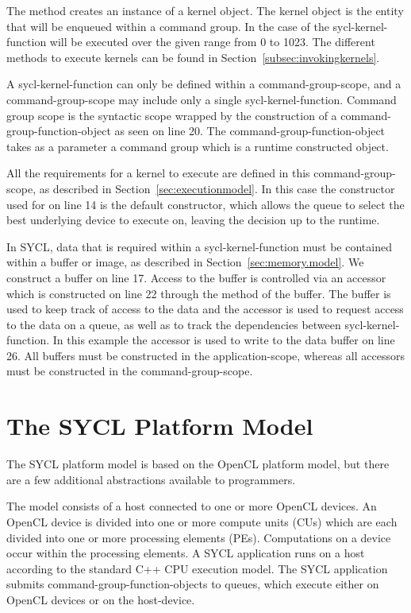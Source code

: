 The  method creates an instance of a kernel object.
The kernel object is the entity that will be enqueued within a
command group.  In the case of  the
\gls{sycl-kernel-function} will be executed over the given range from 0 to 1023.
The different methods to
execute kernels can be found in Section~\ref{subsec:invokingkernels}.

A \gls{sycl-kernel-function} can only be defined within a
\gls{command-group-scope}, and a \gls{command-group-scope} may include
only a single \gls{sycl-kernel-function}. Command group scope is the
syntactic scope wrapped by the construction of a
\gls{command-group-function-object} as seen on line 20. The
\gls{command-group-function-object} takes as a parameter a command
group  which is a runtime constructed object.

All the requirements for a kernel to execute are defined in this
\gls{command-group-scope}, as described in
Section~\ref{sec:executionmodel}.  In this case the constructor used
for  on line 14 is the default constructor, which
allows the queue to select the best underlying device to execute on,
leaving the decision up to the runtime.

In SYCL, data that is required within a \gls{sycl-kernel-function} must
be contained within a \gls{buffer} or \gls{image}, as described in
Section~\ref{sec:memory.model}. We
construct a buffer on line 17. Access to the \gls{buffer} is controlled via
an \gls{accessor} which is constructed on line 22 through the
 method of the buffer. The \gls{buffer} is used to
keep track of access to the data and the \gls{accessor} is used to request
access to the data on a queue, as well as to track the dependencies between
\gls{sycl-kernel-function}. In this example the \gls{accessor} is used to
write to the data buffer on line 26. All \glspl{buffer} must be constructed
in the application-scope, whereas all \glspl{accessor}
must be constructed in the \gls{command-group-scope}.


\section{The SYCL Platform Model}
\label{sec:platformmodel}

The SYCL platform model is based on the OpenCL platform model, but there
are a few additional abstractions available to programmers.

The model consists of a host connected to one or more OpenCL devices.  An OpenCL
device is divided into one or more compute units (CUs) which are each divided
into one or more processing elements (PEs).  Computations on a device occur
within the processing elements.  A SYCL application runs on a host according to
the standard C++ CPU execution model.  The SYCL application submits
\glspl{command-group-function-object} to \glspl{queue}, which execute either on
OpenCL devices or on the \gls{host-device}.

